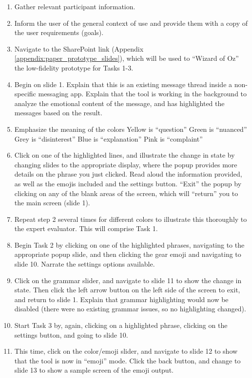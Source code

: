 \documentclass[acmsmall,screen,authorversion,nonacm]{acmart}
\begin{document}
\begin{enumerate}[label*=(\arabic*)]
    \item Gather relevant participant information.
    \item Inform the user of the general context of use and provide them with a copy of the user requirements (goals).
    \item Navigate to the SharePoint link (Appendix \ref{appendix:paper_prototype_slides}), which will be used to “Wizard of Oz” the low-fidelity prototype for Tasks 1-3.
    \item Begin on slide 1. Explain that this is an existing message thread inside a non-specific messaging app. Explain that the tool is working in the background to analyze the emotional content of the message, and has highlighted the messages based on the result.
    \item Emphasize the meaning of the colors
    \subitem Yellow is “question”
    \subitem Green is “nuanced”
    \subitem Grey is “disinterest”
    \subitem Blue is “explanation”
    \subitem Pink is “complaint”
    \item Click on one of the highlighted lines, and illustrate the change in state by changing slides to the appropriate display, where the popup provides more details on the phrase you just clicked. Read aloud the information provided, as well as the emojis included and the settings button. “Exit” the popup by clicking on any of the blank areas of the screen, which will “return” you to the main screen (slide 1).
    \item Repeat step 2 several times for different colors to illustrate this thoroughly to the expert evaluator. This will comprise Task 1.
    \item Begin Task 2 by clicking on one of the highlighted phrases, navigating to the appropriate popup slide, and then clicking the gear emoji and navigating to slide 10. Narrate the settings options available. 
    \item Click on the grammar slider, and navigate to slide 11 to show the change in state. Then click the left arrow button on the left side of the screen to exit, and return to slide 1. Explain that grammar highlighting would now be disabled (there were no existing grammar issues, so no highlighting changed).
    \item Start Task 3 by, again, clicking on a highlighted phrase, clicking on the settings button, and going to slide 10.
    \item This time, click on the color/emoji slider, and navigate to slide 12 to show that the tool is now in “emoji” mode. Click the back button, and change to slide 13 to show a sample screen of the emoji output.

\end{enumerate}
\end{document}
